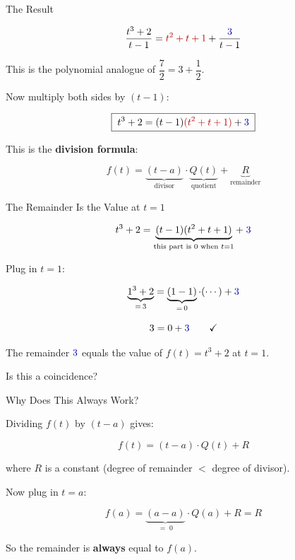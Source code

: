 \documentclass[10pt]{beamer}
\theoremstyle{definition}
\newcommand{\x}[1]{\alert{\textbf{#1}}}
\newcommand{\rd}[1]{{\color{red!70!black}#1}}
\newcommand{\bl}[1]{{\color{blue!70!black}#1}}
\begin{document}
\begin{frame}{The Result}

$$\frac{t^3 + 2}{t - 1} = \rd{t^2 + t + 1} + \frac{\bl{3}}{t - 1}$$

\vfill

This is the polynomial analogue of $\dfrac{7}{2} = 3 + \dfrac{1}{2}$.

\vfill

Now multiply both sides by $(t - 1)$:

\vfill

$$\boxed{\;t^3 + 2 = (t - 1)\rd{(t^2 + t + 1)} + \bl{3}\;}$$

\vfill

This is the \x{division formula}:

$$f(t) = \underbrace{(t - a)}_{\text{divisor}} \cdot \underbrace{Q(t)}_{\text{quotient}} + \underbrace{R}_{\text{remainder}}$$

\vfill
\end{frame}


\begin{frame}{The Remainder Is the Value at $t = 1$}

$$t^3 + 2 = \underbrace{(t - 1)(t^2 + t + 1)}_{\text{this part is } 0 \text{ when } t = 1} + \;\bl{3}$$

\vfill

Plug in $t = 1$:

$$\underbrace{1^3 + 2}_{= \, 3} = \underbrace{(1 - 1)}_{= \, 0} \cdot (\cdots) + \bl{3}$$

\vfill

$$3 = 0 + \bl{3} \qquad \checkmark$$

\vfill

The remainder $\bl{3}$ equals the value of $f(t) = t^3 + 2$ at $t = 1$.

\vfill

Is this a coincidence?

\vfill
\end{frame}


\begin{frame}{Why Does This Always Work?}

Dividing $f(t)$ by $(t - a)$ gives:

$$f(t) = (t - a) \cdot Q(t) + R$$

\vfill

where $R$ is a constant (degree of remainder $<$ degree of divisor).

\vfill

Now plug in $t = a$:

$$f(a) = \underbrace{(a - a)}_{=\; 0} \cdot Q(a) + R = R$$

\vfill

So the remainder is \x{always} equal to $f(a)$.

\vfill

\begin{center}
\end{center}

\vfill
\end{frame}
\end{document}
